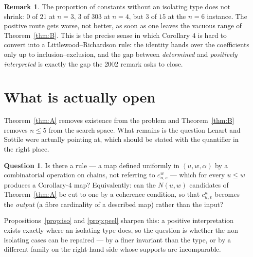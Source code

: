\documentclass[11pt]{article}
\theoremstyle{plain}
\theoremstyle{definition}
\newtheorem{remark}[theorem]{Remark}
\newtheorem{question}[theorem]{Question}
\begin{document}
\begin{remark}
The proportion of constants without an isolating type does not shrink: $0$ of
$21$ at $n=3$, $3$ of $303$ at $n=4$, but $3$ of $15$ at the $n=6$ instance.  The
positive route gets worse, not better, as soon as one leaves the vacuous range of
Theorem~\ref{thm:B}.  This is the precise sense in which Corollary 4 is hard to
convert into a Littlewood--Richardson rule: the identity hands over the
coefficients only up to inclusion--exclusion, and the gap between
\emph{determined} and \emph{positively interpreted} is exactly the gap the 2002
remark asks to close.
\end{remark}

\section{What is actually open}

Theorem~\ref{thm:A} removes existence from the problem and
Theorem~\ref{thm:B} removes $n\le5$ from the search space.  What remains is the
question Lenart and Sottile were actually pointing at, which should be stated
with the quantifier in the right place.

\begin{question}\label{q:canonical}
Is there a rule --- a map defined uniformly in $(u,w,\alpha)$ by a combinatorial
operation on chains, not referring to $c^w_{u,v}$ --- which for every $u\le w$
produces a Corollary-4 map?  Equivalently: can the $N(u,w)$ candidates of
Theorem~\ref{thm:A} be cut to one by a coherence condition, so that
$c^w_{u,v}$ becomes the \emph{output} (a fibre cardinality of a described map)
rather than the input?
\end{question}

Propositions~\ref{prop:iso} and \ref{prop:peel} sharpen this: a positive
interpretation exists exactly where an isolating type does, so the question is
whether the non-isolating cases can be repaired --- by a finer invariant than the
type, or by a different family on the right-hand side whose supports are
incomparable.
\end{document}
